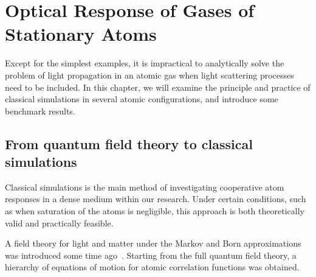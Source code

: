\makeatletter
\newcommand{\lambdabar}{{\mathchoice
  {\smash@bar\textfont\displaystyle{0.25}{1.2}\lambda}
  {\smash@bar\textfont\textstyle{0.25}{1.2}\lambda}
  {\smash@bar\scriptfont\scriptstyle{0.25}{1.2}\lambda}
  {\smash@bar\scriptscriptfont\scriptscriptstyle{0.25}{1.2}\lambda}
}}
\newcommand{\smash@bar}[4]{%
  \smash{\rlap{\raisebox{-#3\fontdimen5#10}{$\m@th#2\mkern#4mu\mathchar'26$}}}%
}
\makeatother

\chapter{Optical Response of Gases of Stationary Atoms}

Except for the simplest examples, it is impractical to analytically solve the problem of light propagation in an atomic gas when light scattering processes need to be included. In this chapter, we will examine the principle and practice of classical simulations in several atomic configurations, and introduce some benchmark results.
 
\section{From quantum field theory to classical simulations}
\label{QFTTOCLASS}

Classical simulations is the main method of investigating cooperative atom responses in a dense medium within our research. Under certain conditions, such as when saturation of the atoms is negligible, this approach is both theoretically valid and practically feasible.

A field theory for light and matter under the Markov and Born approximations was introduced some time ago~\cite{PhysRevA.55.513}. Starting from the full quantum field theory, a hierarchy of equations of motion for atomic correlation functions was obtained.

